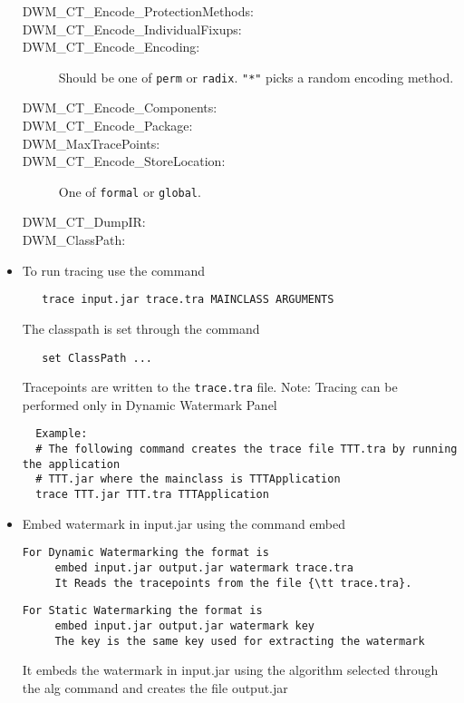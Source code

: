 \begin{itemize}
\begin{description}
          \item[DWM\_CT\_Encode\_ProtectionMethods:]
          \item[DWM\_CT\_Encode\_IndividualFixups:]
          \item[DWM\_CT\_Encode\_Encoding:]
                Should be one of {\tt perm} or {\tt radix}.
                 {\tt "*"} picks a random encoding method.
          \item[DWM\_CT\_Encode\_Components:]       
          \item[DWM\_CT\_Encode\_Package:]
          \item[DWM\_MaxTracePoints:]          
          \item[DWM\_CT\_Encode\_StoreLocation:]
              One of {\tt formal} or {\tt global}.
          \item[DWM\_CT\_DumpIR:]               
          \item[DWM\_ClassPath:]
        \end{description}
    
  \item To run tracing use the command
\begin{verbatim}
   trace input.jar trace.tra MAINCLASS ARGUMENTS 
\end{verbatim}
     The classpath is set through the command
\begin{verbatim}
   set ClassPath ...
\end{verbatim}
  Tracepoints are written to the {\tt trace.tra} file.
  Note: Tracing can be performed only in Dynamic Watermark Panel
\begin{verbatim}
  Example: 
  # The following command creates the trace file TTT.tra by running the application
  # TTT.jar where the mainclass is TTTApplication 
  trace TTT.jar TTT.tra TTTApplication
\end{verbatim}
  
  \item Embed watermark in input.jar using the command embed
\begin{verbatim}
For Dynamic Watermarking the format is
     embed input.jar output.jar watermark trace.tra
     It Reads the tracepoints from the file {\tt trace.tra}.	
\end{verbatim}
\begin{verbatim}
For Static Watermarking the format is
     embed input.jar output.jar watermark key
     The key is the same key used for extracting the watermark
\end{verbatim}
It embeds the watermark in input.jar using the algorithm selected through the alg command and creates the file output.jar


\end{itemize}
